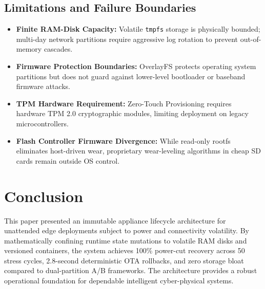 \documentclass[conference]{IEEEtran}
\begin{document}
\subsection{Limitations and Failure Boundaries}
\begin{itemize}
    \item \textbf{Finite RAM-Disk Capacity:} Volatile \texttt{tmpfs} storage is physically bounded; multi-day network partitions require aggressive log rotation to prevent out-of-memory cascades.
    \item \textbf{Firmware Protection Boundaries:} OverlayFS protects operating system partitions but does not guard against lower-level bootloader or baseband firmware attacks.
    \item \textbf{TPM Hardware Requirement:} Zero-Touch Provisioning requires hardware TPM 2.0 cryptographic modules, limiting deployment on legacy microcontrollers.
    \item \textbf{Flash Controller Firmware Divergence:} While read-only rootfs eliminates host-driven wear, proprietary wear-leveling algorithms in cheap SD cards remain outside OS control.
\end{itemize}

\section{Conclusion}
This paper presented an immutable appliance lifecycle architecture for unattended edge deployments subject to power and connectivity volatility. By mathematically confining runtime state mutations to volatile RAM disks and versioned containers, the system achieves 100\% power-cut recovery across 50 stress cycles, 2.8-second deterministic OTA rollbacks, and zero storage bloat compared to dual-partition A/B frameworks. The architecture provides a robust operational foundation for dependable intelligent cyber-physical systems.
\end{document}
